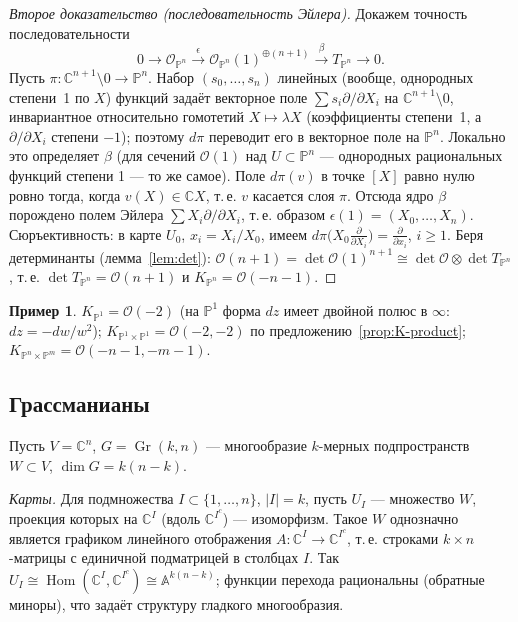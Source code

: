 \documentclass[11pt,a4paper]{article}
\theoremstyle{plain}
\theoremstyle{definition}
\newtheorem{example}[theorem]{Пример}
\theoremstyle{remark}
\renewcommand{\C}{\mathbb{C}}
\newcommand{\PP}{\mathbb{P}}
\newcommand{\A}{\mathbb{A}}
\newcommand{\cO}{\mathcal{O}}
\DeclareMathOperator{\Gr}{Gr}
\DeclareMathOperator{\Hom}{Hom}
\begin{document}
\begin{proof}[Второе доказательство (последовательность Эйлера)]
Докажем точность последовательности
\[
0\to\cO_{\PP^n}\xrightarrow{\ \epsilon\ }\cO_{\PP^n}(1)^{\oplus(n+1)}\xrightarrow{\ \beta\ } T_{\PP^n}\to0 .
\]
Пусть $\pi\colon\C^{n+1}\setminus0\to\PP^n$. Набор $(s_0,\dots,s_n)$ линейных (вообще,
однородных степени~1 по $X$) функций задаёт векторное поле $\sum s_i\partial/\partial X_i$ на
$\C^{n+1}\setminus 0$, инвариантное относительно гомотетий $X\mapsto\lambda X$ (коэффициенты
степени~1, а $\partial/\partial X_i$ степени $-1$); поэтому $d\pi$ переводит его в векторное поле
на $\PP^n$. Локально это определяет $\beta$ (для сечений $\cO(1)$ над $U\subset\PP^n$ ---
однородных рациональных функций степени 1 --- то же самое). Поле $d\pi(v)$ в точке $[X]$ равно нулю
ровно тогда, когда $v(X)\in\C X$, т.\,е. $v$ касается слоя $\pi$. Отсюда ядро $\beta$ порождено
полем Эйлера $\sum X_i\partial/\partial X_i$, т.\,е. образом $\epsilon(1)=(X_0,\dots,X_n)$.
Сюръективность: в карте $U_0$, $x_i=X_i/X_0$, имеем
$d\pi\big(X_0\frac{\partial}{\partial X_i}\big)=\frac{\partial}{\partial x_i}$, $i\ge1$.
Беря детерминанты (лемма~\ref{lem:det}):
$\cO(n+1)=\det\cO(1)^{n+1}\cong\det\cO\otimes\det T_{\PP^n}$, т.\,е. $\det T_{\PP^n}=\cO(n+1)$ и
$K_{\PP^n}=\cO(-n-1)$.
\end{proof}

\begin{example}
$K_{\PP^1}=\cO(-2)$ (на $\PP^1$ форма $dz$ имеет двойной полюс в $\infty$: $dz=-dw/w^2$);
$K_{\PP^1\times\PP^1}=\cO(-2,-2)$ по предложению~\ref{prop:K-product};
$K_{\PP^n\times\PP^m}=\cO(-n-1,-m-1)$.
\end{example}

\subsection{Грассманианы}

Пусть $V=\C^n$, $G=\Gr(k,n)$ --- многообразие $k$-мерных подпространств $W\subset V$,
$\dim G=k(n-k)$.

\emph{Карты.} Для подмножества $I\subset\{1,\dots,n\}$, $|I|=k$, пусть $U_I$ --- множество $W$,
проекция которых на $\C^I$ (вдоль $\C^{I^c}$) --- изоморфизм. Такое $W$ однозначно является
графиком линейного отображения $A\colon\C^I\to\C^{I^c}$, т.\,е. строками $k\times n$-матрицы с
единичной подматрицей в столбцах $I$. Так $U_I\cong\Hom(\C^I,\C^{I^c})\cong\A^{k(n-k)}$; функции
перехода рациональны (обратные миноры), что задаёт структуру гладкого многообразия.
\end{document}
